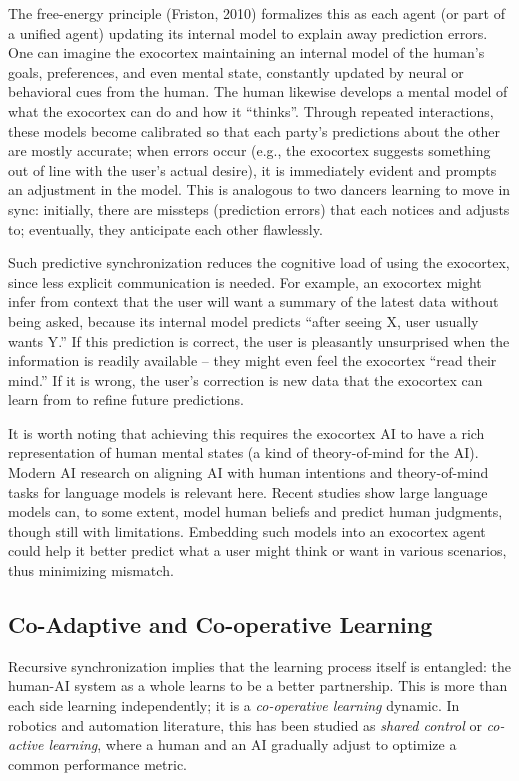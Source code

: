 \documentclass[11pt]{article}
\newcommand{\quotes}[1]{``#1''}
\begin{document}
The free-energy principle (Friston, 2010) formalizes this as each agent (or part of a unified agent) updating its internal model to explain away prediction errors. One can imagine the exocortex maintaining an internal model of the human's goals, preferences, and even mental state, constantly updated by neural or behavioral cues from the human. The human likewise develops a mental model of what the exocortex can do and how it \quotes{thinks}. Through repeated interactions, these models become calibrated so that each party's predictions about the other are mostly accurate; when errors occur (e.g., the exocortex suggests something out of line with the user's actual desire), it is immediately evident and prompts an adjustment in the model. This is analogous to two dancers learning to move in sync: initially, there are missteps (prediction errors) that each notices and adjusts to; eventually, they anticipate each other flawlessly.

Such predictive synchronization reduces the cognitive load of using the exocortex, since less explicit communication is needed. For example, an exocortex might infer from context that the user will want a summary of the latest data without being asked, because its internal model predicts \quotes{after seeing X, user usually wants Y.} If this prediction is correct, the user is pleasantly unsurprised when the information is readily available -- they might even feel the exocortex \quotes{read their mind.} If it is wrong, the user's correction is new data that the exocortex can learn from to refine future predictions.

It is worth noting that achieving this requires the exocortex AI to have a rich representation of human mental states (a kind of theory-of-mind for the AI). Modern AI research on aligning AI with human intentions and theory-of-mind tasks for language models is relevant here. Recent studies show large language models can, to some extent, model human beliefs and predict human judgments, though still with limitations. Embedding such models into an exocortex agent could help it better predict what a user might think or want in various scenarios, thus minimizing mismatch.

\subsection{Co-Adaptive and Co-operative Learning}
Recursive synchronization implies that the learning process itself is entangled: the human-AI system as a whole learns to be a better partnership. This is more than each side learning independently; it is a \textit{co-operative learning} dynamic. In robotics and automation literature, this has been studied as \textit{shared control} or \textit{co-active learning}, where a human and an AI gradually adjust to optimize a common performance metric. 
\end{document}
